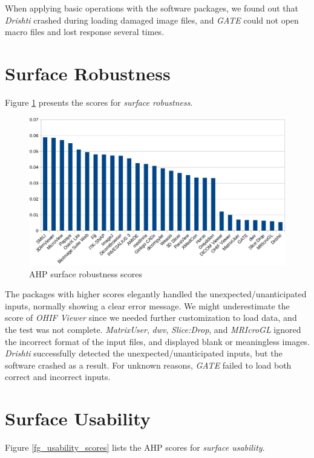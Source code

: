 When applying basic operations with the software packages, we found out that \textit{Drishti} crashed during loading damaged image files, and \textit{GATE} could not open macro files and lost response several times.

\section{Surface Robustness}
\label{sec_result_robustness}
Figure \ref{fg_robustness_scores} presents the scores for \textit{surface robustness}.

\begin{figure}[H]
\includegraphics[scale=0.38]{figures/robustness_scores.png}
\caption{AHP surface robustness scores}
\label{fg_robustness_scores}
\end{figure}

The packages with higher scores elegantly handled the unexpected/unanticipated inputs, normally showing a clear error message. We might underestimate the score of \textit{OHIF Viewer} since we needed further customization to load data, and the test was not complete. \textit{MatrixUser}, \textit{dwv}, \textit{Slice:Drop}, and \textit{MRIcroGL} ignored the incorrect format of the input files, and displayed blank or meaningless images. \textit{Drishti} successfully detected the unexpected/unanticipated inputs, but the software crashed as a result. For unknown reasons, \textit{GATE} failed to load both correct and incorrect inputs.

\section{Surface Usability}
Figure \ref{fg_usability_scores} lists the AHP scores for \textit{surface usability}.

